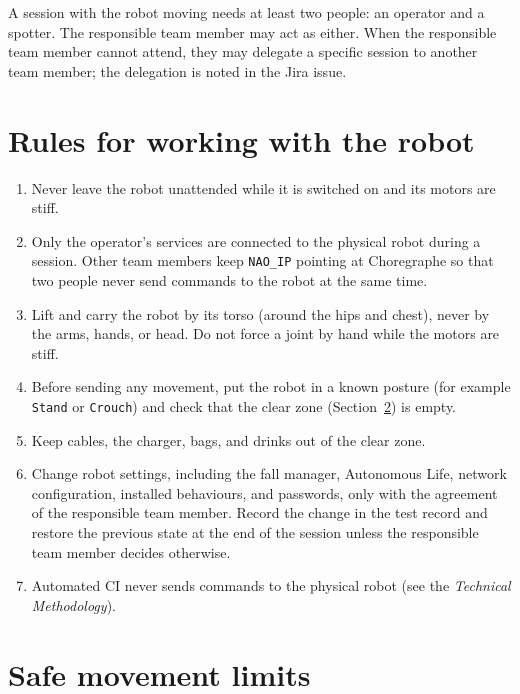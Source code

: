 \documentclass[12pt,a4paper]{article}
\begin{document}
A session with the robot moving needs at least two people: an operator and a spotter. The responsible team member may act as either. When the responsible team member cannot attend, they may delegate a specific session to another team member; the delegation is noted in the Jira issue.

\section{Rules for working with the robot}
\label{sec:rules}

\begin{enumerate}

\item Never leave the robot unattended while it is switched on and its motors are stiff.

\item Only the operator's services are connected to the physical robot during a session. Other team members keep \texttt{NAO\_IP} pointing at Choregraphe so that two people never send commands to the robot at the same time.

\item Lift and carry the robot by its torso (around the hips and chest), never by the arms, hands, or head. Do not force a joint by hand while the motors are stiff.

\item Before sending any movement, put the robot in a known posture (for example \texttt{Stand} or \texttt{Crouch}) and check that the clear zone (Section~\ref{sec:limits}) is empty.

\item Keep cables, the charger, bags, and drinks out of the clear zone.

\item Change robot settings, including the fall manager, Autonomous Life, network configuration, installed behaviours, and passwords, only with the agreement of the responsible team member. Record the change in the test record and restore the previous state at the end of the session unless the responsible team member decides otherwise.

\item Automated CI never sends commands to the physical robot (see the \emph{Technical Methodology}).

\end{enumerate}

\section{Safe movement limits}
\label{sec:limits}
\end{document}
